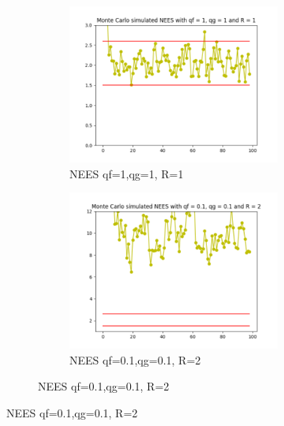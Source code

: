 \documentclass{article}
\begin{document}
        \begin{figure}[H]
            \centering            
            \begin{subfigure} {1\textwidth}    
                \begin{subfigure}{.3\textwidth}  
                    \includegraphics[width=1\linewidth]{./img/mc/nees.png}
                    \caption{NEES qf=1,qg=1, R=1 }
                \end{subfigure}
                \begin{subfigure}{.3\textwidth}  
                    \includegraphics[width=1\linewidth]{./img/mc/nees01r2.png}
                    \caption{NEES qf=0.1,qg=0.1, R=2}
                \end{subfigure}

\end{subfigure}
\end{figure}
\end{document}
